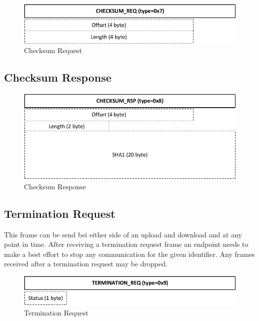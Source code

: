 \documentclass[]{article}
\begin{document}
\begin{figure}[H]
\centering
\includegraphics[width=\textwidth]{frames/checksum-req.pdf}
\caption{Checksum Request}
\label{CHECKSUM-REQ}
\end{figure}

\subsection{Checksum Response}

\begin{figure}[H]
\centering
\includegraphics[width=\textwidth]{frames/checksum-rsp.pdf}
\caption{Checksum Response}
\label{CHECKSUM-RSP}
\end{figure}

\subsection{Termination Request}

This frame can be send bei either side of an upload and
download and at any point in time. After receiving
a termination request frame an endpoint needs to make a best
effort to stop any communication for the given identifier.
Any frames received after a termination request may be dropped.

\begin{figure}[H]
\centering
\includegraphics[width=\textwidth]{frames/shutdown-req.pdf}
\caption{Termination Request}
\label{TERMINATION-REQ}
\end{figure}
\end{document}
